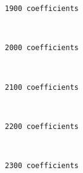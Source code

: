     \begin{Verbatim}[commandchars=\\\{\}]
1900 coefficients
    \end{Verbatim}

    \begin{center}
    \end{center}
    { \hspace*{\fill} \\}
    
    \begin{Verbatim}[commandchars=\\\{\}]
2000 coefficients
    \end{Verbatim}

    \begin{center}
    \end{center}
    { \hspace*{\fill} \\}
    
    \begin{Verbatim}[commandchars=\\\{\}]
2100 coefficients
    \end{Verbatim}

    \begin{center}
    \end{center}
    { \hspace*{\fill} \\}
    
    \begin{Verbatim}[commandchars=\\\{\}]
2200 coefficients
    \end{Verbatim}

    \begin{center}
    \end{center}
    { \hspace*{\fill} \\}
    
    \begin{Verbatim}[commandchars=\\\{\}]
2300 coefficients
    \end{Verbatim}

    \begin{center}
    \end{center}
    { \hspace*{\fill} \\}
    
